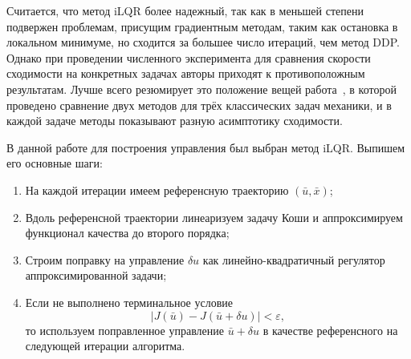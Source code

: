 \documentclass[../../doc.tex]{subfiles}
\begin{document}
    Считается, что метод iLQR более надежный,
    так как в меньшей степени подвержен проблемам,
    присущим градиентным методам,
    таким как остановка в локальном минимуме,
    но сходится за большее число итераций, чем метод DDP.
    Однако при проведении численного эксперимента для сравнения скорости сходимости на конкретных задачах авторы приходят к противоположным результатам.
    Лучше всего резюмирует это положение вещей работа~\cite{manchester2016}, в которой проведено сравнение двух методов для трёх классических задач механики, и в каждой задаче методы показывают разную асимптотику сходимости.

    В данной работе для построения управления был выбран метод iLQR. Выпишем его основные шаги:
    \begin{enumerate}\itemsep0em
        \item На каждой итерации имеем референсную траекторию $(\bar u, \bar x)$;
        \item Вдоль референсной траектории линеаризуем задачу Коши и аппроксимируем функционал качества до второго порядка;
        \item Строим поправку на управление $\delta u$ как линейно-квадратичный регулятор аппроксимированной задачи;
        \item Если не выполнено терминальное условие
            \begin{equation}
                \left|J(\bar u) - J(\bar u + \delta u)\right| < \varepsilon,
            \end{equation}
            то используем поправленное управление $\bar u + \delta u$ в качестве референсного на следующей итерации алгоритма.
            
    \end{enumerate}

    \ifSubfilesClassLoaded{
        \nocite{*}
        \clearpage
        
        
    }{}
\end{document}
